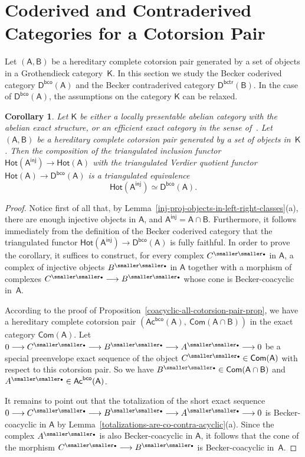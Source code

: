\documentclass[12pt,a4paper]{amsart}
\newcommand{\+}{\nobreakdash-}
\renewcommand{\:}{\colon}
\newcommand{\rarrow}{\longrightarrow}
\newcommand{\bu}{{\text{\smaller\smaller$\scriptstyle\bullet$}}}
\newcommand{\sA}{\mathsf A}
\newcommand{\sB}{\mathsf B}
\newcommand{\sD}{\mathsf D}
\newcommand{\sK}{\mathsf K}
\newcommand{\Hot}{\mathsf{Hot}}
\newcommand{\Com}{\mathsf{Com}}
\newcommand{\Ac}{\mathsf{Ac}}
\newcommand{\inj}{\mathsf{inj}}
\newcommand{\bco}{\mathsf{bco}}
\newcommand{\bctr}{\mathsf{bctr}}
\newcommand{\Section}[1]{\bigskip\section{#1}\medskip}
\theoremstyle{plain}
\newtheorem{cor}[thm]{Corollary}
\theoremstyle{definition}
\begin{document}
\Section{Coderived and Contraderived Categories for a Cotorsion Pair}

 Let $(\sA,\sB)$ be a hereditary complete cotorsion pair generated
by a set of objects in a Grothendieck category~$\sK$.
 In this section we study the Becker coderived category
$\sD^\bco(\sA)$ and the Becker contraderived category $\sD^\bctr(\sB)$.
 In the case of $\sD^\bco(\sA)$, the assumptions on the category $\sK$
can be relaxed.

\begin{cor} \label{coderived-of-A-well-behaved}
 Let\/ $\sK$ be either a locally presentable abelian category with
the abelian exact structure, or an efficient exact category in
the sense of\/~\cite{Sto-ICRA}.
 Let $(\sA,\sB)$ be a hereditary complete cotorsion pair generated
by a set of objects in\/~$\sK$.
 Then the composition of the triangulated inclusion functor\/
$\Hot(\sA^\inj)\rarrow\Hot(\sA)$ with the triangulated Verdier
quotient functor\/ $\Hot(\sA)\rarrow\sD^\bco(\sA)$ is a triangulated
equivalence
$$
 \Hot(\sA^\inj)\simeq\sD^\bco(\sA).
$$
\end{cor}

\begin{proof}
 Notice first of all that, by
Lemma~\ref{inj-proj-objects-in-left-right-classes}(a), there are enough
injective objects in $\sA$, and $\sA^\inj=\sA\cap\sB$.
 Furthermore, it follows immediately from the definition of
the Becker coderived category that the triangulated functor
$\Hot(\sA^\inj)\rarrow\sD^\bco(\sA)$ is fully faithful.
 In order to prove the corollary, it suffices to construct, for every
complex $C^\bu$ in $\sA$, a complex of injective objects $B^\bu$ in
$\sA$ together with a morphism of complexes $C^\bu\rarrow B^\bu$
whose cone is Becker-coacyclic in~$\sA$.

 According to the proof of
Proposition~\ref{coacyclic-all-cotorsion-pair-prop}, we have
a hereditary complete cotorsion pair
$(\Ac^\bco(\sA),\>\Com(\sA\cap\sB))$ in the exact category $\Com(\sA)$.
 Let $0\rarrow C^\bu\rarrow B^\bu\rarrow A^\bu\rarrow0$ be a special
preenvelope exact sequence of the object $C^\bu\in\Com(\sA)$ with
respect to this cotorsion pair.
 So we have $B^\bu\in\Com(\sA\cap\sB)$ and $A^\bu\in\Ac^\bco(\sA)$.

 It remains to point out that the totalization of the short exact
sequence $0\rarrow C^\bu\rarrow B^\bu\rarrow A^\bu\rarrow0$ is
Becker-coacyclic in $\sA$ by
Lemma~\ref{totalizations-are-co-contra-acyclic}(a).
 Since the complex $A^\bu$ is also Becker-coacyclic in $\sA$,
it follows that the cone of the morphism $C^\bu\rarrow B^\bu$ is
Becker-coacyclic in~$\sA$.
\end{proof}
\end{document}
